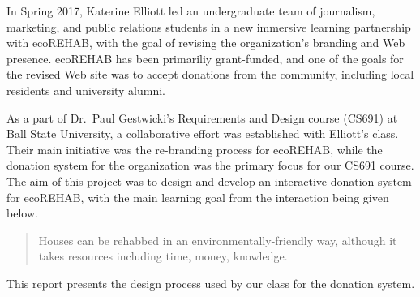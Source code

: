 \documentclass[letter]{article}
\begin{document}
In Spring 2017, Katerine Elliott led an undergraduate team of journalism,
marketing, and public relations students in a new immersive learning
partnership with ecoREHAB, with the goal of revising the organization's
branding and Web presence.
ecoREHAB has been primariliy grant-funded, and one of the 
goals for the revised Web site was to accept donations from
the community, including local residents and university alumni.

As a part of Dr.\ Paul Gestwicki's Requirements and Design course (CS691)
at Ball State University, a collaborative effort was established with
Elliott's class. 
Their main initiative was the re-branding process for
ecoREHAB, while the donation system for the organization was the
primary focus for our CS691 course. The aim of this project was to
design and develop an interactive donation system for ecoREHAB, with
the main learning goal from the interaction being given below.

\begin{quote}
	Houses can be rehabbed in an environmentally-friendly way, although it takes resources including time, money, knowledge. 
\end{quote}

This report presents the design process used by our class for the
donation system.
\end{document}
